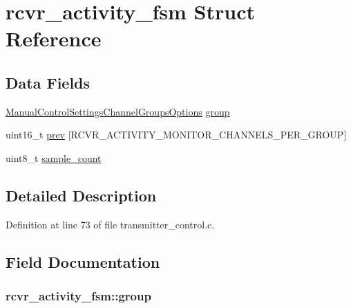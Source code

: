 \hypertarget{structrcvr__activity__fsm}{\section{rcvr\-\_\-activity\-\_\-fsm \-Struct \-Reference}
\label{structrcvr__activity__fsm}
}
\subsection*{\-Data \-Fields}
\begin{DoxyCompactItemize}
\item 
\hyperlink{group___manual_control_settings_ga94e1fe696fef2f85cbdb4a2e479c7ed2}{\-Manual\-Control\-Settings\-Channel\-Groups\-Options} \hyperlink{structrcvr__activity__fsm_a734a4dabb33f34467848db90882fc877}{group}
\item 
uint16\-\_\-t \hyperlink{structrcvr__activity__fsm_acbfbcf2f18825d85bc9c672190f3d357}{prev} \mbox{[}\-R\-C\-V\-R\-\_\-\-A\-C\-T\-I\-V\-I\-T\-Y\-\_\-\-M\-O\-N\-I\-T\-O\-R\-\_\-\-C\-H\-A\-N\-N\-E\-L\-S\-\_\-\-P\-E\-R\-\_\-\-G\-R\-O\-U\-P\mbox{]}
\item 
uint8\-\_\-t \hyperlink{structrcvr__activity__fsm_a68c72760513df75e420f5ed8c2046e9c}{sample\-\_\-count}
\end{DoxyCompactItemize}


\subsection{\-Detailed \-Description}


\-Definition at line 73 of file transmitter\-\_\-control.\-c.



\subsection{\-Field \-Documentation}
\hypertarget{structrcvr__activity__fsm_a734a4dabb33f34467848db90882fc877}{
\subsubsection[{group}]{ {\bf rcvr\-\_\-activity\-\_\-fsm\-::group}}}\label{structrcvr__activity__fsm_a734a4dabb33f34467848db90882fc877}


